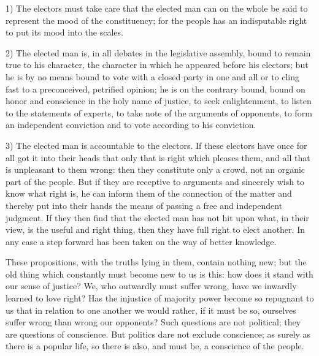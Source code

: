 \documentclass[12pt,a4paper,openany]{book}
\newcommand{\opage}[1]{\marginnote{\footnotesize\textit{[#1]}}}
\newcounter{lect}
\begin{document}
1) The electors must take care that the elected man
can on the whole be said to represent the
mood of the constituency; for the people has an indisputable right to
put its mood into the scales.

2) The elected man is, in all debates in the
legislative assembly, bound to remain true to his character,
the character in which he appeared
before his electors; but he is by no means bound
to vote with a closed party in one and all or
to cling fast to a preconceived, petrified opinion;
he is on the contrary bound, bound on honor and conscience in the holy
name of justice, to seek
enlightenment, to listen to the statements of experts, to take note of the
arguments of opponents, to form an independent conviction
and to vote according to his conviction.

3) The elected man is accountable to the electors.
If these electors have once for all got it
\setcounter{footnote}{0}%
\opage{101}into their heads that only that is right which pleases them, and
all that is unpleasant to them wrong: then they constitute
only a crowd, not an organic part of the people.
But if they are receptive to arguments and sincerely wish to know
what right is, he can inform them of the connection of the matter
and thereby put into their hands the means of
passing a free and independent judgment. If they then find that the
elected man has not hit upon what, in their view,
is the useful and right thing, then they have full right
to elect another. In any case a step forward has been taken
on the way of better knowledge.

These propositions, with the truths lying in them,
contain nothing new; but the old thing which constantly
must become new to us is this: how does it stand
with our sense of justice? We, who outwardly must suffer
wrong, have we inwardly learned to love right? Has the injustice
of majority power become so repugnant to us
that in relation to one another we would rather,
if it must be so, ourselves suffer wrong than wrong
our opponents? Such questions are not political;
they are questions of conscience. But politics dare
not exclude conscience; as surely as there is a
popular life, so there is also, and must be, a conscience of the people.
\end{document}
